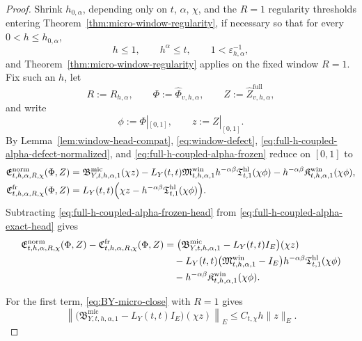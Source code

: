 \documentclass[11pt,a4paper]{amsart}
\theoremstyle{plain}
\theoremstyle{definition}
\theoremstyle{remark}
\begin{document}
\begin{proof}
Shrink \(h_{0,\alpha}\), depending only on \(t\), \(\alpha\), \(\chi\), and the \(R=1\)
regularity thresholds entering Theorem~\ref{thm:micro-window-regularity}, if necessary so that for
every \(0<h\le h_{0,\alpha}\),
\[
h\le1,
\qquad
h^\alpha\le t,
\qquad
1<\varepsilon_{h,\alpha}^{-1},
\]
and Theorem~\ref{thm:micro-window-regularity} applies on the fixed window \(R=1\). Fix such an
\(h\), let
\[
R:=R_{h,\alpha},
\qquad
\Phi:=\widehat\Phi_{v,h,\alpha},
\qquad
Z:=\widehat Z_{v,h,\alpha}^{\mathrm{full}},
\]
and write
\[
\phi:=\Phi|_{[0,1]},
\qquad
z:=Z|_{[0,1]}.
\]
By Lemma~\ref{lem:window-head-compat},
\eqref{eq:window-defect}, \eqref{eq:full-h-coupled-alpha-defect-normalized}, and
\eqref{eq:full-h-coupled-alpha-frozen} reduce on \([0,1]\) to
\begin{align}
\mathfrak E_{t,h,\alpha,R,\chi}^{\mathrm{norm}}(\Phi,Z)
&=
\mathfrak B_{Y,t,h,\alpha,1}^{\mathrm{mic}}(\chi z)
-
L_Y(t,t)\mathfrak M_{t,h,\alpha,1}^{\mathrm{win}}
h^{-\alpha\beta}\mathfrak T_{t,1}^{\mathrm{hl}}(\chi\phi)
-
h^{-\alpha\beta}\mathfrak K_{t,h,\alpha,1}^{\mathrm{win}}(\chi\phi),
\label{eq:full-h-coupled-alpha-exact-head}\\
\mathfrak C_{t,h,\alpha,R,\chi}^{\mathrm{fr}}(\Phi,Z)
&=
L_Y(t,t)
\Bigl(
\chi z
-
h^{-\alpha\beta}\mathfrak T_{t,1}^{\mathrm{hl}}(\chi\phi)
\Bigr).
\label{eq:full-h-coupled-alpha-frozen-head}
\end{align}
Subtracting \eqref{eq:full-h-coupled-alpha-frozen-head} from
\eqref{eq:full-h-coupled-alpha-exact-head} gives
\begin{align}
\mathfrak E_{t,h,\alpha,R,\chi}^{\mathrm{norm}}(\Phi,Z)
-
\mathfrak C_{t,h,\alpha,R,\chi}^{\mathrm{fr}}(\Phi,Z)
&=
\bigl(
\mathfrak B_{Y,t,h,\alpha,1}^{\mathrm{mic}}
-
L_Y(t,t)I_E
\bigr)(\chi z)
\notag\\
&\quad-
L_Y(t,t)
\bigl(
\mathfrak M_{t,h,\alpha,1}^{\mathrm{win}}
-
I_E
\bigr)
h^{-\alpha\beta}\mathfrak T_{t,1}^{\mathrm{hl}}(\chi\phi)
\notag\\
&\quad-
h^{-\alpha\beta}\mathfrak K_{t,h,\alpha,1}^{\mathrm{win}}(\chi\phi).
\label{eq:full-h-coupled-alpha-exact-minus-frozen}
\end{align}

For the first term, \eqref{eq:BY-micro-close} with \(R=1\) gives
\begin{equation}\label{eq:full-h-coupled-alpha-exact-minus-frozen-1}
\left\|
\bigl(
\mathfrak B_{Y,t,h,\alpha,1}^{\mathrm{mic}}
-
L_Y(t,t)I_E
\bigr)(\chi z)
\right\|_E
\le
C_{t,\chi}h\|z\|_E.
\end{equation}


\end{proof}
\end{document}
